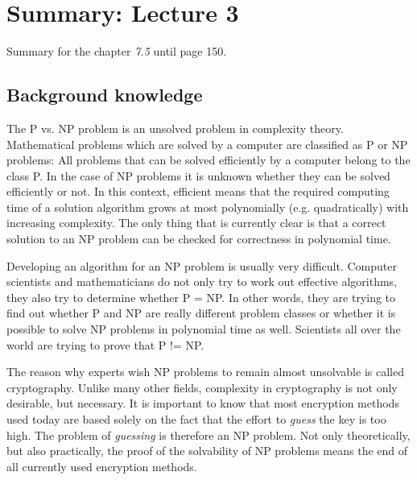 \documentclass[a4]{scrartcl}
\begin{document}




\section*{Summary: Lecture 3}

Summary for the chapter \textit{7.5} until page 150. \cite{CC, book}




\subsection*{Background knowledge}

The P vs. NP problem is an unsolved problem in complexity theory.
Mathematical problems which are solved by a computer are classified as P or NP problems: All problems that can be solved efficiently by a computer belong to the class P. In the case of NP problems it is unknown whether they can be solved efficiently or not. In this context, efficient means that the required computing time of a solution algorithm grows at most polynomially (e.g. quadratically) with increasing complexity. The only thing that is currently clear is that a correct solution to an NP problem can be checked for correctness in polynomial time. 

Developing an algorithm for an NP problem is usually very difficult. Computer scientists and mathematicians do not only try to work out effective algorithms, they also try to determine whether P = NP. In other words, they are trying to find out whether P and NP are really different problem classes or whether it is possible to solve NP problems in polynomial time as well. Scientists all over the world are trying to prove that P != NP. 

The reason why experts wish NP problems to remain almost unsolvable is called cryptography. Unlike many other fields, complexity in cryptography is not only desirable, but necessary. It is important to know that most encryption methods used today are based solely on the fact that the effort to \textit{guess} the key is too high. The problem of \textit{guessing} is therefore an NP problem. Not only theoretically, but also practically, the proof of the solvability of NP problems means the end of all currently used encryption methods.
\end{document}
